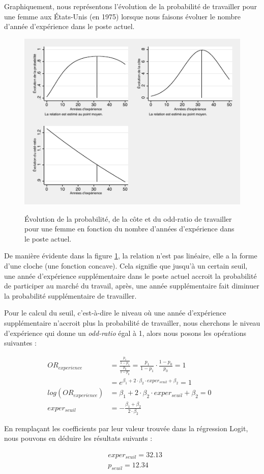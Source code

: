 Graphiquement, nous représentons l'évolution de la probabilité de travailler pour une femme aux États-Unis (en 1975) lorsque nous faisons évoluer le nombre d'année d'expérience dans le poste actuel. 

\begin{figure}[!h]
    \caption{Évolution de la probabilité, de la côte et du odd-ratio de travailler pour une femme en fonction du nombre d'années d'expérience dans le poste actuel.}
    \includegraphics[scale = 1.5]{101_graphics/EvoProbaExperience.pdf}
    \centering
    \label{fig:EvolutionDelaProbabilitéEnFonctionDesAnnées}
\end{figure}

De manière évidente dans la figure \ref{fig:EvolutionDelaProbabilitéEnFonctionDesAnnées}, la relation n'est pas linéaire, elle a la forme d'une cloche (une fonction concave). Cela signifie que jusqu'à un certain seuil, une année d'expérience supplémentaire dans le poste actuel accroit la probabilité de participer au marché du travail, après, une année supplémentaire fait diminuer la probabilité supplémentaire de travailler. 

\vspace*{0.3cm}

Pour le calcul du seuil, c'est-à-dire le niveau où une année d'expérience supplémentaire n'accroit plus la probabilité de travailler, nous cherchons le niveau d'expérience qui donne un \emph{odd-ratio} égal à 1, alors nous posons les opérations suivantes : 
 
\begin{align}
    OR_{experience} & =  \frac{\frac{p_1}{1-p_1}}{\frac{p_0}{1-p_0}}  =  \frac{p_1}{1-p_1} \cdot \frac{1-p_0}{p_0}  = 1 & \nonumber \\
    & =  e^{\beta_1 + 2 \cdot \beta_2 \cdot exper_{seuil} + \beta_2} =1 & \nonumber \\
    log(OR_{experience}) & =  \beta_1 + 2 \cdot \beta_2 \cdot exper_{seuil} + \beta_2 = 0  &\nonumber \\ 
    exper_{seuil} & =  - \frac{\beta_1 + \beta_2}{2 \cdot \beta_2} \nonumber
\end{align}

En remplaçant les coefficients par leur valeur trouvée dans la régression Logit, nous pouvons en déduire les résultats suivants : 


\begin{align}
    &exper_{seuil} =  32.13 \nonumber \\
    &p_{seuil} = 12.34 \nonumber 
\end{align}
